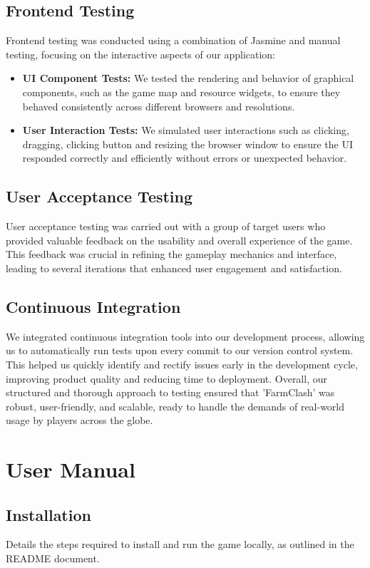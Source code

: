 \documentclass[12pt]{article}
\begin{document}
\subsection{Frontend Testing}
Frontend testing was conducted using a combination of Jasmine and manual testing, focusing on the interactive aspects of our application:
\begin{itemize}
    \item \textbf{UI Component Tests:} We tested the rendering and behavior of graphical components, such as the game map and resource widgets, to ensure they behaved consistently across different browsers and resolutions.
    \item \textbf{User Interaction Tests:} We simulated user interactions such as clicking, dragging, clicking button and resizing the browser window to ensure the UI responded correctly and efficiently without errors or unexpected behavior.
\end{itemize}
\subsection{User Acceptance Testing}
User acceptance testing was carried out with a group of target users who provided valuable feedback on the usability and overall experience of the game. This feedback was crucial in refining the gameplay mechanics and interface, leading to several iterations that enhanced user engagement and satisfaction.
\subsection{Continuous Integration}
We integrated continuous integration tools into our development process, allowing us to automatically run tests upon every commit to our version control system. This helped us quickly identify and rectify issues early in the development cycle, improving product quality and reducing time to deployment.
Overall, our structured and thorough approach to testing ensured that 'FarmClash' was robust, user-friendly, and scalable, ready to handle the demands of real-world usage by players across the globe.

\section{User Manual}
\subsection{Installation}
Details the steps required to install and run the game locally, as outlined in the README document.
\end{document}
